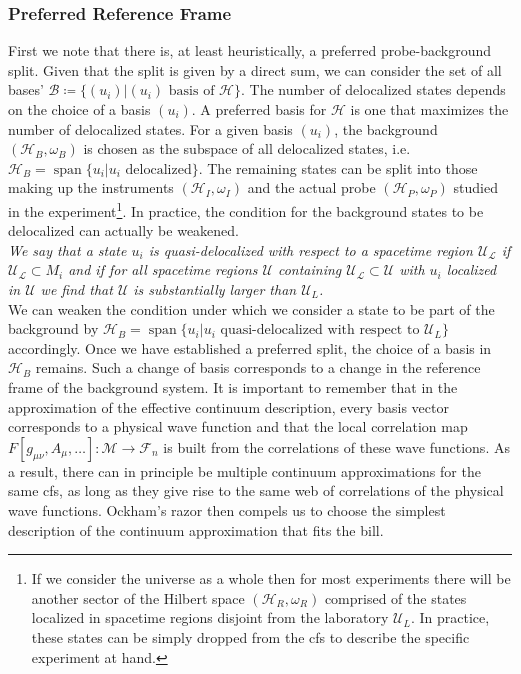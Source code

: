 \documentclass[reqno,11pt]{amsart}
\DeclareMathOperator{\Span}{span}
\newcommand{\defeq}{\coloneqq}
\renewcommand{\H}{\mathcal{H}}
\newcommand{\F}{{\mathcal{F}}}
\numberwithin{equation}{section}
\begin{document}
\subsubsection{Preferred Reference Frame}\label{subsubsec:preferedRF}
First we note that there is, at least heuristically, a preferred probe-background split.
Given that the split is given by a direct sum,
we can consider the set of all bases' $\mathcal{B} \defeq \{(u_i) | (u_i) \text{ basis of } \H \}$.
The number of delocalized states depends on the choice of a basis $(u_i)$.
A preferred basis for $\H$ is one that maximizes the number of delocalized states.
For a given basis $(u_i)$, the background $(\H_B,\omega_B)$ is chosen as the subspace of all delocalized states,
i.e.~$\H_B = \Span\{u_i | u_i \text{ delocalized}\}$.
The remaining states can be split into those
making up the instruments $(\H_I,\omega_I)$ and the actual probe $(\H_P,\omega_P)$
studied in the experiment\footnote{If we consider the universe as a whole then for most experiments there will be another sector of the Hilbert space $(\H_R,\omega_R)$ comprised of the states localized in spacetime regions disjoint from the laboratory $\mathcal{U}_L$. In practice, these states can be simply dropped from the \ac{cfs} to describe the specific experiment at hand.}.
In practice, the condition for the background states to be delocalized can actually be weakened.\\

\textit{
We say that a state $u_i$ is quasi-delocalized with respect to a spacetime region $\mathcal{U_L}$ if $\mathcal{U_L}\subset M_i$ and if for all spacetime regions $\mathcal{U}$ containing $\mathcal{U_L}\subset \mathcal{U}$ with $u_i$ localized in $\mathcal{U}$ we find that $\mathcal{U}$ is substantially larger than $\mathcal{U}_L$.
} \\

We can weaken the condition
under which we consider a state
to be part of the background by $\H_B = \Span\{u_i|u_i \text{ quasi-delocalized with respect to }\mathcal{U}_L\} $ accordingly.
Once we have established a preferred split, the choice of a basis in $\H_B$ remains.
Such a change of basis corresponds to a change in the reference frame of the background system.
It is important to remember that in the approximation of the effective continuum description,
every basis vector corresponds to a physical wave function
and that the local correlation map $F[g_{\mu\nu}, A_\mu,\dots]: \mathcal{M} \rightarrow \F_n$ is built from the correlations of these wave functions.
As a result, there can in principle be multiple continuum approximations for the same \ac{cfs},
as long as they give rise to the same web of correlations of the physical wave functions.
Ockham's razor then compels us to choose the simplest description of the continuum approximation that fits the bill.
\end{document}
